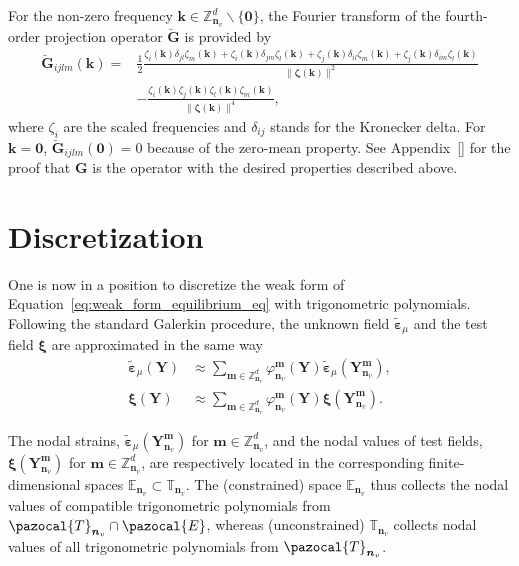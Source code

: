 For the non-zero frequency \(\bm k \in \mathbb{Z}_{\bm n_v}^{d} \backslash\{\bm 0\}\), the Fourier transform of the fourth-order projection operator \(\breve{\bm G}\) is provided by
\begin{equation} \label{eq:projection_operator_small_strains}
\begin{aligned}
\breve{\bm G}_{i j l m}(\boldsymbol{k})=& \frac{1}{2} \frac{\zeta_{i}(\boldsymbol{k}) \delta_{j l} \zeta_{m}(\boldsymbol{k})+\zeta_{i}(\boldsymbol{k}) \delta_{j m} \zeta_{l}(\boldsymbol{k})+\zeta_{j}(\boldsymbol{k}) \delta_{i l} \zeta_{m}(\boldsymbol{k})+\zeta_{j}(\boldsymbol{k}) \delta_{i m} \zeta_{l}(\boldsymbol{k})}{\|\boldsymbol{\zeta}(\boldsymbol{k})\|^{2}} \\
&-\frac{\zeta_{i}(\boldsymbol{k}) \zeta_{j}(\boldsymbol{k}) \zeta_{l}(\boldsymbol{k}) \zeta_{m}(\boldsymbol{k})}{\|\boldsymbol{\zeta}(\boldsymbol{k})\|^{4}},
\end{aligned}
\end{equation}
where \(\zeta_{i}\) are the scaled frequencies and \(\delta_{i j}\) stands for the Kronecker delta.
For \(\boldsymbol{k}=\mathbf{0}\), \(\breve{\bm G}_{i j l m}(\mathbf{0})=0\) because of the zero-mean property.
See Appendix~\eqref{} for the proof that \(\bm G\) is the operator with the desired properties described above.

\section{Discretization}

One is now in a position to discretize the weak form of Equation~\eqref{eq:weak_form_equilibrium_eq} with trigonometric polynomials.
Following the standard Galerkin procedure, the unknown field \(\tilde{\bm \varepsilon}_\mu\) and the test field \(\bm \xi\) are approximated in the same way
\begin{align}
\tilde{\bm\varepsilon}_\mu(\bm{Y}) &\approx \sum_{\bm  m \in \mathbb{Z}_{\bm n_v}^{d}} \varphi_{\bm n_v}^{\bm  m}(\bm{Y}) \tilde{\bm \varepsilon}_\mu \left(\bm Y_{\bm n_v}^{\bm  m}\right), \\
\bm \xi(\bm{Y}) &\approx \sum_{\bm  m \in \mathbb{Z}_{\bm n_v}^{d}} \varphi_{\bm n_v}^{\bm m}(\bm{Y}) \bm \xi\left(\bm{Y}_{\bm n_v}^{\bm  m}\right).
\end{align}

The nodal strains, \(\tilde{\bm\varepsilon}_\mu\left(\bm Y_{\bm n_v}^{\bm  m}\right)\) for \(\bm m\in \mathbb Z^d_{\bm n_v}\), and the nodal values of test fields, \(\bm \xi\left(\bm Y_{\bm n_v}^{\bm  m}\right)\) for \(\bm m\in \mathbb Z^d_{\bm n_v}\), are respectively located in the corresponding finite-dimensional spaces \(\mathbb{E}_{\bm n_v} \subset \mathbb{T}_{\bm n_v}\).
The (constrained) space \(\mathbb{E}_{\bm n_v}\) thus collects the nodal values of compatible trigonometric polynomials from \(\pazocal{T}_{\bm n_v} \cap \pazocal{E}\), whereas (unconstrained) \(\mathbb{T}_{\bm n_v}\) collects nodal values of all trigonometric polynomials from \(\pazocal{T}_{\bm n_v}\).


